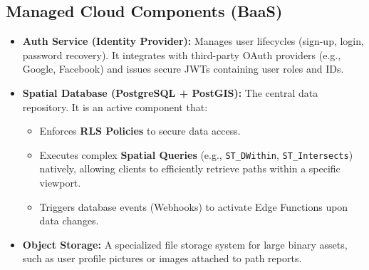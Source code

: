 \subsection{Managed Cloud Components (BaaS)}
\begin{itemize}
    \item \textbf{Auth Service (Identity Provider):} Manages user lifecycles (sign-up, login, password recovery). It integrates with third-party OAuth providers (e.g., Google, Facebook) and issues secure JWTs containing user roles and IDs.
    
    \item \textbf{Spatial Database (PostgreSQL + PostGIS):} The central data repository. It is an active component that:
    \begin{itemize}
        \item Enforces \textbf{RLS Policies} to secure data access.
        \item Executes complex \textbf{Spatial Queries} (e.g., \texttt{ST\_DWithin}, \texttt{ST\_Intersects}) natively, allowing clients to efficiently retrieve paths within a specific viewport.
        \item Triggers database events (Webhooks) to activate Edge Functions upon data changes.
    \end{itemize}
    
    \item \textbf{Object Storage:} A specialized file storage system for large binary assets, such as user profile pictures or images attached to path reports.
\end{itemize}

